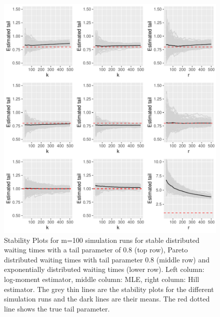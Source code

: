 \documentclass[]{elsarticle} %
\begin{document}
\begin{figure}

{\centering \includegraphics[width=1\linewidth]{article_springer_files/figure-latex/TailSimuplots-1} 

}

\caption{\label{Fig:TailSimu} Stability Plots for m=100 simulation runs for stable distributed waiting times with a tail parameter of 0.8 (top row), Pareto distributed waiting times with tail parameter 0.8 (middle row) and exponentially distributed waiting times (lower row). Left column: log-moment estimator, middle column: MLE, right column: Hill estimator. The grey thin lines are the stability plots for the different simulation runs and the dark lines are their means. The red dotted line shows the true tail parameter. }\label{fig:TailSimuplots}
\end{figure}
\end{document}
